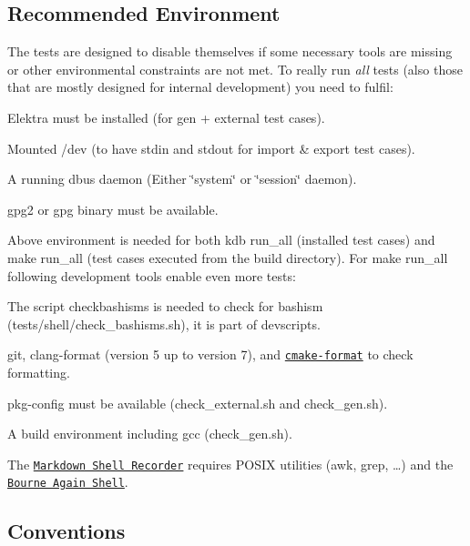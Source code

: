 \subsection*{Recommended Environment}

The tests are designed to disable themselves if some necessary tools are missing or other environmental constraints are not met. To really run {\itshape all} tests (also those that are mostly designed for internal development) you need to fulfil\+:


\begin{DoxyItemize}
\item Elektra must be installed (for gen + external test cases).
\item Mounted /dev (to have stdin and stdout for import \& export test cases).
\item A running dbus daemon (Either \char`\"{}system\char`\"{} or \char`\"{}session\char`\"{} daemon).
\item {\ttfamily gpg2} or {\ttfamily gpg} binary must be available.
\end{DoxyItemize}

Above environment is needed for both {\ttfamily kdb run\+\_\+all} (installed test cases) and {\ttfamily make run\+\_\+all} (test cases executed from the build directory). For {\ttfamily make run\+\_\+all} following development tools enable even more tests\+:


\begin{DoxyItemize}
\item The script {\ttfamily checkbashisms} is needed to check for bashism (tests/shell/check\+\_\+bashisms.\+sh), it is part of {\ttfamily devscripts}.
\item {\ttfamily git}, {\ttfamily clang-\/format} (version 5 up to version 7), and \href{https://github.com/cheshirekow/cmake_format}{\tt cmake-\/format} to check formatting.
\item {\ttfamily pkg-\/config} must be available (check\+\_\+external.\+sh and check\+\_\+gen.\+sh).
\item A build environment including gcc (check\+\_\+gen.\+sh).
\item The \href{https://master.libelektra.org/tests/shell/shell_recorder/tutorial_wrapper}{\tt Markdown Shell Recorder} requires P\+O\+S\+IX utilities ({\ttfamily awk}, {\ttfamily grep}, …) and the \href{https://www.gnu.org/software/bash}{\tt Bourne Again Shell}.
\end{DoxyItemize}

\subsection*{Conventions}


